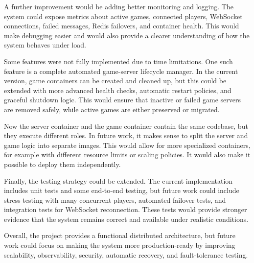 \documentclass{scrartcl}
\begin{document}
A further improvement would be adding better monitoring and logging. The system could expose metrics about active games, connected players, WebSocket connections, failed messages, Redis failovers, and container health. This would make debugging easier and would also provide a clearer understanding of how the system behaves under load.

Some features were not fully implemented due to time limitations. One such feature is a complete automated game-server lifecycle manager. In the current version, game containers can be created and cleaned up, but this could be extended with more advanced health checks, automatic restart policies, and graceful shutdown logic. This would ensure that inactive or failed game servers are removed safely, while active games are either preserved or migrated.

Now the server container and the game container contain the same codebase, but they execute different roles. In future work, it makes sense to split the server and game logic into separate images. This would allow for more specialized containers, for example with different resource limits or scaling policies. It would also make it possible to deploy them independently.

Finally, the testing strategy could be extended. The current implementation includes unit tests and some end-to-end testing, but future work could include stress testing with many concurrent players, automated failover tests, and integration tests for WebSocket reconnection. These tests would provide stronger evidence that the system remains correct and available under realistic conditions.

Overall, the project provides a functional distributed architecture, but future work could focus on making the system more production-ready by improving scalability, observability, security, automatic recovery, and fault-tolerance testing.
\end{document}
